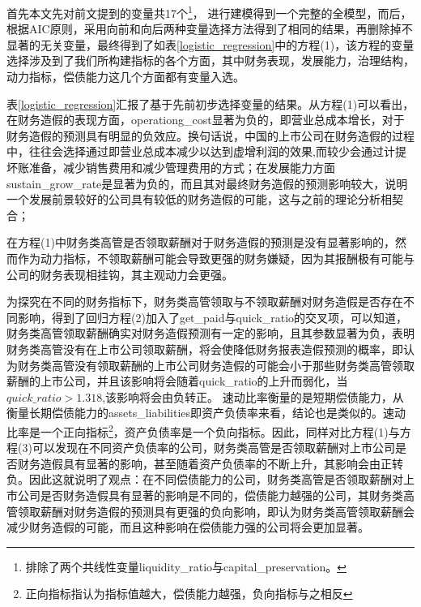 
首先本文先对前文提到的变量共17个\footnote{排除了两个共线性变量liquidity\_ratio与capital\_preservation。}，
进行建模得到一个完整的全模型，而后，根据AIC原则，采用向前和向后两种变量选择方法得到了相同的结果，再删除掉不显著的无关变量，最终得到了如表\ref{logistic_regression}中的方程(1)，该方程的变量选择涉及到了我们所构建指标的各个方面，其中财务表现，发展能力，治理结构，动力指标，偿债能力这几个方面都有变量入选。

表\ref{logistic_regression}汇报了基于先前初步选择变量的结果。从方程(1)可以看出，在财务造假的表现方面，operationg\_cost显著为负的，即营业总成本增长，对于财务造假的预测具有明显的负效应。换句话说，中国的上市公司在财务造假的过程中，往往会选择通过即营业总成本减少以达到虚增利润的效果,而较少会通过计提坏账准备，减少销售费用和减少管理费用的方式；在发展能力方面sustain\_grow\_rate是显著为负的，而且其对最终财务造假的预测影响较大，说明一个发展前景较好的公司具有较低的财务造假的可能，这与之前的理论分析相契合；


在方程(1)中财务类高管是否领取薪酬对于财务造假的预测是没有显著影响的，然而作为动力指标，不领取薪酬可能会导致更强的财务嫌疑，因为其报酬极有可能与公司的财务表现相挂钩，其主观动力会更强。

为探究在不同的财务指标下，财务类高管领取与不领取薪酬对财务造假是否存在不同影响，得到了回归方程(2)加入了get\_paid与quick\_ratio的交叉项，可以知道，财务类高管领取薪酬确实对财务造假预测有一定的影响，且其参数显著为负，表明财务类高管没有在上市公司领取薪酬，将会使降低财务报表造假预测的概率，即认为财务类高管没有领取薪酬的上市公司财务造假的可能会小于那些财务类高管领取薪酬的上市公司，并且该影响将会随着quick\_ratio的上升而弱化，当$quick\_ratio>1.318$,该影响将会由负转正。
速动比率衡量的是短期偿债能力，从衡量长期偿债能力的assets\_liabilities即资产负债率来看，结论也是类似的。速动比率是一个正向指标\footnote{正向指标指认为指标值越大，偿债能力越强，负向指标与之相反}，资产负债率是一个负向指标。因此，同样对比方程(1)与方程(3)可以发现在不同资产负债率的公司，财务类高管是否领取薪酬对上市公司是否财务造假具有显著的影响，甚至随着资产负债率的不断上升，其影响会由正转负。因此这就说明了观点：在不同偿债能力的公司，财务类高管是否领取薪酬对上市公司是否财务造假具有显著的影响是不同的，偿债能力越强的公司，其财务类高管领取薪酬对财务造假的预测具有更强的负向影响，即认为财务类高管领取薪酬会减少财务造假的可能，而且这种影响在偿债能力强的公司将会更加显著。








